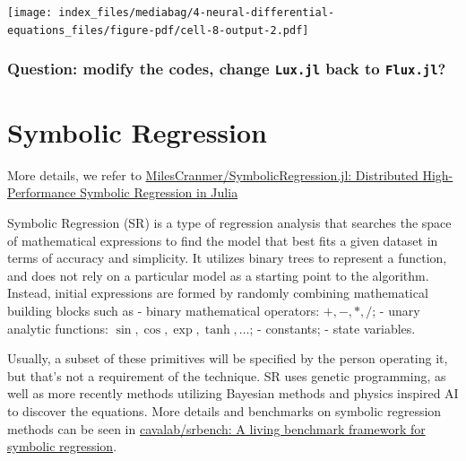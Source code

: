 \documentclass[
  letterpaper,
  DIV=11,
  numbers=noendperiod]{scrreport}
\begin{document}
\texttt{[image: index\_files/mediabag/4-neural-differential-equations\_files/figure-pdf/cell-8-output-2.pdf]}

\subsection{\texorpdfstring{Question: modify the codes, change
\texttt{Lux.jl} back to
\texttt{Flux.jl}?}{Question: modify the codes, change Lux.jl back to Flux.jl?}}\label{question-modify-the-codes-change-lux.jl-back-to-flux.jl}


\chapter{Symbolic Regression}\label{symbolic-regression}

More details, we refer to
\href{https://github.com/MilesCranmer/SymbolicRegression.jl}{MilesCranmer/SymbolicRegression.jl:
Distributed High-Performance Symbolic Regression in Julia}

Symbolic Regression (SR) is a type of regression analysis that searches
the space of mathematical expressions to find the model that best fits a
given dataset in terms of accuracy and simplicity. It utilizes binary
trees to represent a function, and does not rely on a particular model
as a starting point to the algorithm. Instead, initial expressions are
formed by randomly combining mathematical building blocks such as -
binary mathematical operators: \(+, -, *, /\); - unary analytic
functions: \(\sin, \cos, \exp , \tanh, \dots\); - constants; - state
variables.

Usually, a subset of these primitives will be specified by the person
operating it, but that's not a requirement of the technique. SR uses
genetic programming, as well as more recently methods utilizing Bayesian
methods and physics inspired AI to discover the equations. More details
and benchmarks on symbolic regression methods can be seen in
\href{https://github.com/cavalab/srbench}{cavalab/srbench: A living
benchmark framework for symbolic regression}.
\end{document}

